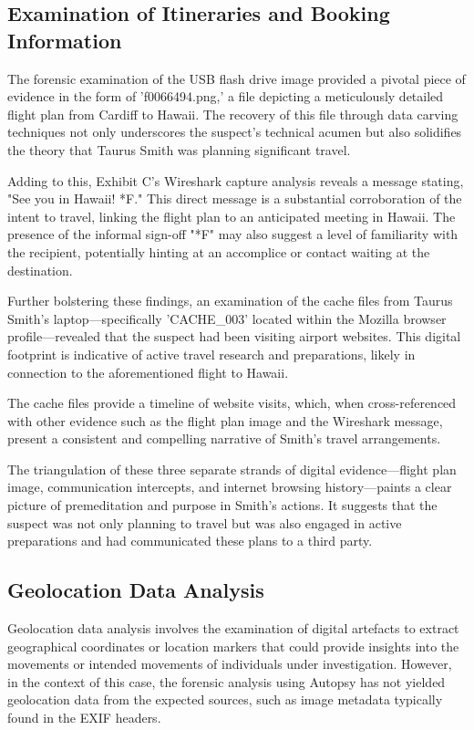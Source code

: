\subsection{Examination of Itineraries and Booking Information}
The forensic examination of the USB flash drive image provided a pivotal piece of evidence in the form of 'f0066494.png,' a file depicting a meticulously detailed flight plan from Cardiff to Hawaii. The recovery of this file through data carving techniques not only underscores the suspect's technical acumen but also solidifies the theory that Taurus Smith was planning significant travel.

Adding to this, Exhibit C's Wireshark capture analysis reveals a message stating, "See you in Hawaii! *F." This direct message is a substantial corroboration of the intent to travel, linking the flight plan to an anticipated meeting in Hawaii. The presence of the informal sign-off "*F" may also suggest a level of familiarity with the recipient, potentially hinting at an accomplice or contact waiting at the destination.

Further bolstering these findings, an examination of the cache files from Taurus Smith's laptop—specifically 'CACHE\_003' located within the Mozilla browser profile—revealed that the suspect had been visiting airport websites. This digital footprint is indicative of active travel research and preparations, likely in connection to the aforementioned flight to Hawaii.

The cache files provide a timeline of website visits, which, when cross-referenced with other evidence such as the flight plan image and the Wireshark message, present a consistent and compelling narrative of Smith's travel arrangements.

The triangulation of these three separate strands of digital evidence—flight plan image, communication intercepts, and internet browsing history—paints a clear picture of premeditation and purpose in Smith's actions. It suggests that the suspect was not only planning to travel but was also engaged in active preparations and had communicated these plans to a third party.

\subsection{Geolocation Data Analysis}
Geolocation data analysis involves the examination of digital artefacts to extract geographical coordinates or location markers that could provide insights into the movements or intended movements of individuals under investigation. However, in the context of this case, the forensic analysis using Autopsy has not yielded geolocation data from the expected sources, such as image metadata typically found in the EXIF headers.

